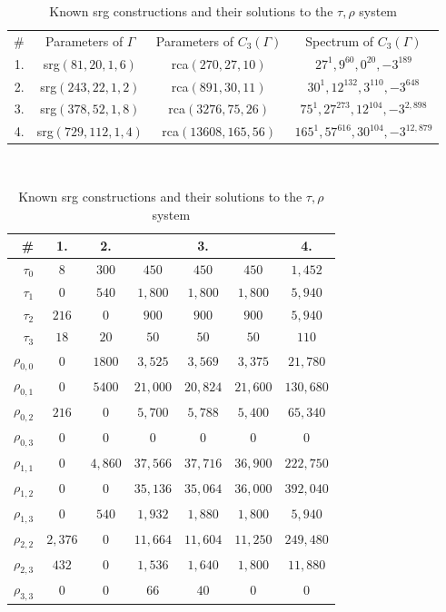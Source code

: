 \documentclass[12pt]{report}
\theoremstyle{definition}
\begin{document}
\begin{table}[htbp]
\centering
\begin{tabular}{|r|c|c|c|}
\hline
   \# & Parameters of $\Gamma$ & Parameters of $C_3(\Gamma)$ & Spectrum of $C_3(\Gamma)$ \\
\hhline{|====|}
1. & srg$(81,20,1,6)$ & rca$(270,27,10)$ & $27^1,9^{60},0^{20},-3^{189}$ \\
\hline
2. & srg$(243,22,1,2)$ & rca$(891,30,11)$ & $30^1,12^{132},3^{110},-3^{648}$ \\
\hline
3. & srg$(378,52,1,8)$ & rca$(3276,75,26)$ & $75^1,27^{273},12^{104},-3^{2,898}$ \\
\hline
4. & srg$(729,112,1,4)$ & rca$(13608,165,56)$ & $165^1,57^{616},30^{104},-3^{12,879}$ \\
\hline
\end{tabular}
\\[1em]
\begin{tabular}{|r||c|c|c|c|c|c|}
\hline
 \#   &  1.  &  2.  &  \multicolumn{3}{|c|}{3.}   &  4.  \\
 \hline
 $\tau_0$  &  $8$  &  $300$  &  $450$  &  $450$  &  $450$  &  $1,452$  \\
 \hline
 $\tau_1$  &  $0$  &  $540$  &  $1,800$  &  $1,800$  &  $1,800$  &  $5,940$  \\
 \hline
 $\tau_2$  &  $216$  &  $0$  &  $900$  &  $900$  &  $900$  &  $5,940$  \\
 \hline
 $\tau_3$  &  $18$  &  $20$  &  $50$  &  $50$  &  $50$  &  $110$  \\
 \hline
 $\rho_{0,0}$  &  $0$  &  $1800$  &  $3,525$  &  $3,569$  &  $3,375$  &  $21,780$  \\
 \hline
 $\rho_{0,1}$  &  $0$  &  $5400$  &  $21,000$  &  $20,824$  &  $21,600$  &  $130,680$  \\
 \hline
 $\rho_{0,2}$  &  $216$  &  $0$  &  $5,700$  &  $5,788$  &  $5,400$  &  $65,340$  \\
 \hline
 $\rho_{0,3}$  &  $0$  &  $0$  &  $0$  &  $0$  &  $0$  &  $0$  \\
 \hline
 $\rho_{1,1}$  &  $0$  &  $4,860$  &  $37,566$  &  $37,716$  &  $36,900$  &  $222,750$  \\
 \hline
 $\rho_{1,2}$  &  $0$  &  $0$  &  $35,136$  &  $35,064$  &  $36,000$  &  $392,040$  \\
 \hline
 $\rho_{1,3}$  &  $0$  &  $540$  &  $1,932$  &  $1,880$  &  $1,800$  &  $5,940$  \\
 \hline
 $\rho_{2,2}$  &  $2,376$  &  $0$  &  $11,664$  &  $11,604$  &  $11,250$  &  $249,480$  \\
 \hline
 $\rho_{2,3}$  &  $432$  &  $0$  &  $1,536$  &  $1,640$  &  $1,800$  &  $11,880$  \\
 \hline
 $\rho_{3,3}$  &  $0$  &  $0$  &  $66$  &  $40$  &  $0$  &  $0$ \\
 \hline
\end{tabular}
\caption{Known srg constructions and their solutions to the $\tau,\rho$ system}
\label{tab:taurho}
\end{table}
\end{document}
